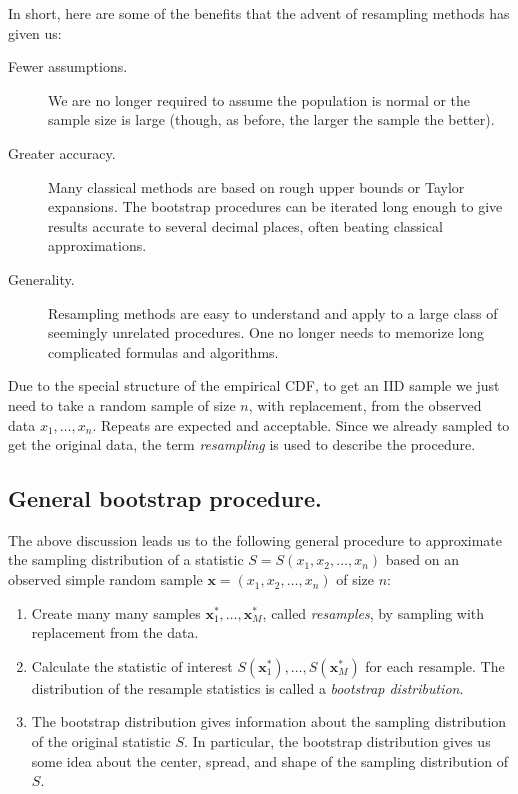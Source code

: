 \documentclass[captions=tableheading]{scrbook}
\begin{document}
In short, here are some of the benefits that the advent of resampling methods has given us:
\begin{description}
\item[Fewer assumptions.] We are no longer required to assume the population is normal or the sample size is large (though, as before, the larger the sample the better).
\item[Greater accuracy.] Many classical methods are based on rough upper bounds or Taylor expansions. The bootstrap procedures can be iterated long enough to give results accurate to several decimal places, often beating classical approximations.
\item[Generality.] Resampling methods are easy to understand and apply to a large class of seemingly unrelated procedures. One no longer needs to memorize long complicated formulas and algorithms.
\end{description}

\begin{rem}
Due to the special structure of the empirical CDF, to get an IID sample we just need to take a random sample of size \(n\), with replacement, from the observed data \(x_{1},\ldots,x_{n}\). Repeats are expected and acceptable. Since we already sampled to get the original data, the term \emph{resampling} is used to describe the procedure.
\end{rem}
\subsection{General bootstrap procedure.}
\label{sec-13-1-1}


The above discussion leads us to the following general procedure to approximate the sampling distribution of a statistic \(S=S(x_{1},x_{2},\ldots,x_{n})\) based on an observed simple random sample \(\mathbf{x}=(x_{1},x_{2},\ldots,x_{n})\) of size \(n\): 

\begin{enumerate}
\item Create many many samples \(\mathbf{x}_{1}^{\ast},\ldots,\mathbf{x}_{M}^{\ast}\), called \emph{resamples}, by sampling with replacement from the data.
\item Calculate the statistic of interest \(S(\mathbf{x}_{1}^{\ast}),\ldots,S(\mathbf{x}_{M}^{\ast})\) for each resample. The distribution of the resample statistics is called a \emph{bootstrap distribution}.
\item The bootstrap distribution gives information about the sampling distribution of the original statistic \(S\). In particular, the bootstrap distribution gives us some idea about the center, spread, and shape of the sampling distribution of \(S\).
\end{enumerate}
\end{document}
